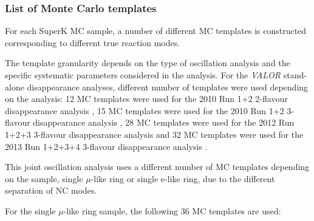 
\subsubsection{List of Monte Carlo templates}
\label{sec:prediction:nominal:templates}


For each SuperK MC sample, a number of different MC templates is constructed 
corresponding to different true reaction modes.

The template granularity depends on the type of oscillation analysis and the specific 
systematic parameters considered in the analysis.
For the {\em VALOR} stand-alone disappearance analyses, different number of templates were used depending on the analysis:
12 MC templates were used for the 2010 Run 1+2 2-flavour disappearance analysis \cite{OurRun12DisappAnalysis}, 
15 MC templates were used for the 2010 Run 1+2 3-flavour disappearance analysis \cite{OurRun12DisappAnalysis3Flavour},
28 MC templates were used for the 2012 Run 1+2+3 3-flavour disappearance analysis \cite{OurRun123DisappAnalysis3Flavour} and
32 MC templates were used for the 2013 Run 1+2+3+4 3-flavour disappearance analysis \cite{OurRun1234DisappAnalysis3Flavour}.

This joint oscillation analysis uses a different number of MC templates depending on the sample, 
single $\mu$-like ring or single e-like ring, due to the different separation of NC modes.

For the single $\mu$-like ring sample, the following 36 MC templates are used:

